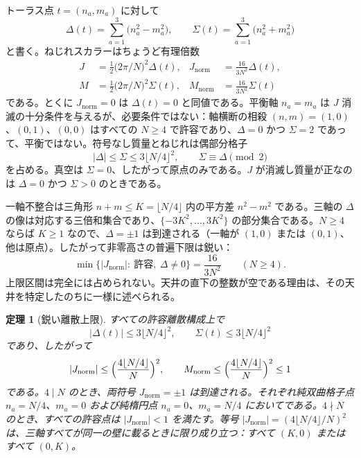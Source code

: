 \documentclass[a4paper]{article}
\newtheorem{theorem}{定理}[section]
\theoremstyle{definition}
\newcommand{\Jnorm}{J_{\mathrm{norm}}}
\newcommand{\Mnorm}{M_{\mathrm{norm}}}
\begin{document}
トーラス点 $t=(n_a,m_a)$ に対して
\[
\Delta(t)=\sum_{a=1}^3\bigl(n_a^2-m_a^2\bigr),\qquad
\Sigma(t)=\sum_{a=1}^3\bigl(n_a^2+m_a^2\bigr)
\]
と書く。ねじれスカラーはちょうど有理倍数
\begin{equation}
\label{eq:spectrum}
\begin{aligned}
J&=\tfrac12\bigl(2\pi/N\bigr)^2\Delta(t),
&
\Jnorm&=\frac{16}{3N^2}\Delta(t),\\
M&=\tfrac12\bigl(2\pi/N\bigr)^2\Sigma(t),
&
\Mnorm&=\frac{16}{3N^2}\Sigma(t)
\end{aligned}
\end{equation}
である。とくに $\Jnorm=0$ は $\Delta(t)=0$ と同値である。平衡軸 $n_a=m_a$ は $J$ 消滅の十分条件を与えるが、必要条件ではない：軸横断の相殺 $(n,m)=(1,0)$、$(0,1)$、$(0,0)$ はすべての $N\geq 4$ で許容であり、$\Delta=0$ かつ $\Sigma=2$ であって、平衡ではない。符号なし質量とねじれは偶部分格子
\[
|\Delta|\leq\Sigma\leq 3\bigl\lfloor N/4\bigr\rfloor^2,\qquad
\Sigma\equiv\Delta\pmod{2}
\]
を占める。真空は $\Sigma=0$、したがって原点のみである。$J$ が消滅し質量が正なのは $\Delta=0$ かつ $\Sigma>0$ のときである。

一軸不整合は三角形 $n+m\leq K=\lfloor N/4\rfloor$ 内の平方差 $n^2-m^2$ である。三軸の $\Delta$ の像は対応する三倍和集合であり、$\{-3K^2,\ldots,3K^2\}$ の部分集合である。$N\geq 4$ ならば $K\geq 1$ なので、$\Delta=\pm 1$ は到達される（一軸が $(1,0)$ または $(0,1)$、他は原点）。したがって非零高さの普遍下限は鋭い：
\begin{equation}
\label{eq:gap}
\min\bigl\{|\Jnorm|:\ \text{許容},\ \Delta\neq 0\bigr\}
=\frac{16}{3N^2}\qquad(N\geq 4).
\end{equation}
上限区間は完全には占められない。天井の直下の整数が空である理由は、その天井を特定したのちに一様に述べられる。

\begin{theorem}[鋭い離散上限]
\label{thm:sharp}
すべての許容離散構成上で
\[
\bigl|\Delta(t)\bigr|\leq 3\bigl\lfloor N/4\bigr\rfloor^2,\qquad
\Sigma(t)\leq 3\bigl\lfloor N/4\bigr\rfloor^2
\]
であり、したがって
\[
|\Jnorm|\leq\Bigl(\frac{4\lfloor N/4\rfloor}{N}\Bigr)^2,\qquad
\Mnorm\leq\Bigl(\frac{4\lfloor N/4\rfloor}{N}\Bigr)^2\leq 1
\]
である。$4\mid N$ のとき、両符号 $\Jnorm=\pm 1$ は到達される。それぞれ純双曲格子点 $n_a=N/4$、$m_a=0$ および純楕円点 $n_a=0$、$m_a=N/4$ においてである。$4\nmid N$ のとき、すべての許容点は $|\Jnorm|<1$ を満たす。等号 $|\Jnorm|=(4\lfloor N/4\rfloor/N)^2$ は、三軸すべてが\emph{同一}の壁に載るときに限り成り立つ：すべて $(K,0)$ またはすべて $(0,K)$。
\end{theorem}
\end{document}
